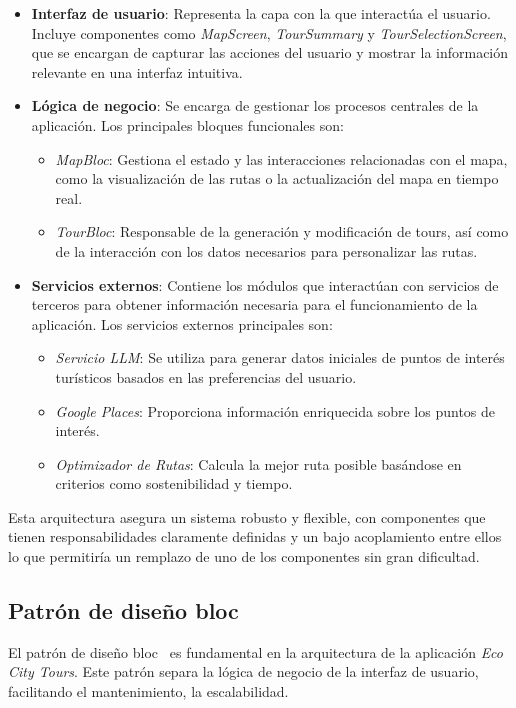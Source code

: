 \begin{itemize}
	\item \textbf{Interfaz de usuario}: Representa la capa con la que interactúa el usuario. Incluye componentes como \textit{MapScreen}, \textit{TourSummary} y \textit{TourSelectionScreen}, que se encargan de capturar las acciones del usuario y mostrar la información relevante en una interfaz intuitiva.
	
	\item \textbf{Lógica de negocio}: Se encarga de gestionar los procesos centrales de la aplicación. Los principales bloques funcionales son:
	\begin{itemize}
		\item \textit{MapBloc}: Gestiona el estado y las interacciones relacionadas con el mapa, como la visualización de las rutas o la actualización del mapa en tiempo real.
		\item \textit{TourBloc}: Responsable de la generación y modificación de tours, así como de la interacción con los datos necesarios para personalizar las rutas.
	\end{itemize}
	
	\item \textbf{Servicios externos}: Contiene los módulos que interactúan con servicios de terceros para obtener información necesaria para el funcionamiento de la aplicación. Los servicios externos principales son:
	\begin{itemize}
		\item \textit{Servicio LLM}: Se utiliza para generar datos iniciales de puntos de interés turísticos basados en las preferencias del usuario.
		\item \textit{Google Places}: Proporciona información enriquecida sobre los puntos de interés.
		\item \textit{Optimizador de Rutas}: Calcula la mejor ruta posible basándose en criterios como sostenibilidad y tiempo.
	\end{itemize}
\end{itemize}

Esta arquitectura asegura un sistema robusto y flexible, con componentes que tienen responsabilidades claramente definidas y un bajo acoplamiento entre ellos lo que permitiría un remplazo de uno de los componentes sin gran dificultad.


\subsection{Patrón de diseño \acrfull{bloc}}
El patrón de diseño \acrshort{bloc}~\cite{flutter_bloc} es fundamental en la arquitectura de la aplicación \textit{Eco City Tours}. Este patrón separa la lógica de negocio de la interfaz de usuario, facilitando el mantenimiento, la escalabilidad.

